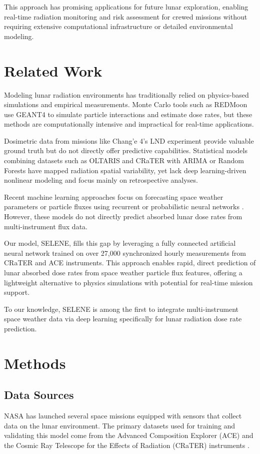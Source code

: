 \documentclass[conference]{IEEEtran}
\begin{document}
This approach has promising applications for future lunar exploration, enabling real-time radiation monitoring and risk assessment for crewed missions without requiring extensive computational infrastructure or detailed environmental modeling.

\section{Related Work}

Modeling lunar radiation environments has traditionally relied on physics-based simulations and empirical measurements. Monte Carlo tools such as REDMoon \cite{Du2024} use GEANT4 to simulate particle interactions and estimate dose rates, but these methods are computationally intensive and impractical for real-time applications.

Dosimetric data from missions like Chang’e 4's LND experiment \cite{Wimmer2020, Zhang2020} provide valuable ground truth but do not directly offer predictive capabilities. Statistical models combining datasets such as OLTARIS and CRaTER with ARIMA or Random Forests \cite{Singleterry2010, Slaba2013} have mapped radiation spatial variability, yet lack deep learning-driven nonlinear modeling and focus mainly on retrospective analyses.

Recent machine learning approaches focus on forecasting space weather parameters or particle fluxes using recurrent or probabilistic neural networks \cite{Papagiannopoulos2023, Zampieri2024}. However, these models do not directly predict absorbed lunar dose rates from multi-instrument flux data.

Our model, SELENE, fills this gap by leveraging a fully connected artificial neural network trained on over 27,000 synchronized hourly measurements from CRaTER and ACE instruments. This approach enables rapid, direct prediction of lunar absorbed dose rates from space weather particle flux features, offering a lightweight alternative to physics simulations with potential for real-time mission support.

To our knowledge, SELENE is among the first to integrate multi-instrument space weather data via deep learning specifically for lunar radiation dose rate prediction.


\section{Methods}

\subsection{Data Sources}
NASA has launched several space missions equipped with sensors that collect data on the lunar environment. The primary datasets used for training and validating this model come from the Advanced Composition Explorer (ACE)\cite{Spence2010,Looper2020}  and the Cosmic Ray Telescope for the Effects of Radiation (CRaTER) instruments \cite{Stone1998ACE, Stone1998SIS, Cummings1998}.
 
\end{document}
